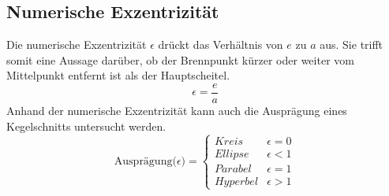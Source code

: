 \subsection{Numerische Exzentrizität}
Die numerische Exzentrizität $\epsilon$ drückt das Verhältnis von $e$ zu $a$ aus. Sie trifft somit eine Aussage darüber, ob der Brennpunkt kürzer oder weiter vom Mittelpunkt entfernt ist als der Hauptscheitel.
\begin{displaymath}
	\epsilon = \frac{e}{a}
\end{displaymath}
Anhand der numerische Exzentrizität kann auch die Ausprägung eines Kegelschnitts untersucht werden.
\begin{displaymath}
   \text{Ausprägung($\epsilon$)} = \left\{
     \begin{array}{lr}
       Kreis & \epsilon = 0 \\
       Ellipse & \epsilon < 1\\
       Parabel & \epsilon = 1\\
       Hyperbel & \epsilon > 1
     \end{array}
   \right.
\end{displaymath}

